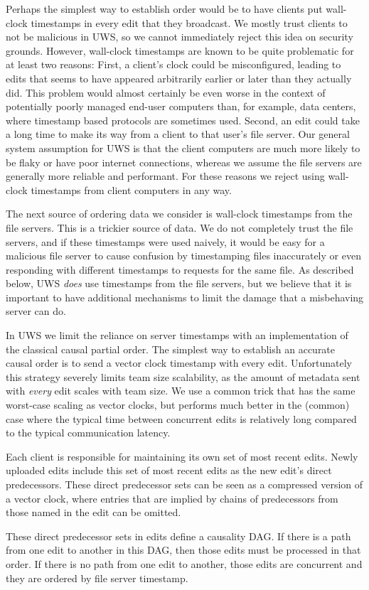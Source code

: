 \documentclass{article}
\begin{document}
Perhaps the simplest way to establish order would be to have clients put wall-clock timestamps in every edit that they broadcast.
We mostly trust clients to not be malicious in UWS, so we cannot immediately reject this idea on security grounds.
However, wall-clock timestamps are known to be quite problematic for at least two reasons:
First, a client's clock could be misconfigured, leading to edits that seems to have appeared arbitrarily earlier or later than they actually did.
This problem would almost certainly be even worse in the context of potentially poorly managed end-user computers than, for example, data centers, where timestamp based protocols are sometimes used.
Second, an edit could take a long time to make its way from a client to that user's file server.
Our general system assumption for UWS is that the client computers are much more likely to be flaky or have poor internet connections, whereas we assume the file servers are generally more reliable and performant.
For these reasons we reject using wall-clock timestamps from client computers in any way.

The next source of ordering data we consider is wall-clock timestamps from the file servers.
This is a trickier source of data.
We do not completely trust the file servers, and if these timestamps were used naively, it would be easy for a malicious file server to cause confusion by timestamping files inaccurately or even responding with different timestamps to requests for the same file.
As described below, UWS \emph{does} use timestamps from the file servers, but we believe that it is important to have additional mechanisms to limit the damage that a misbehaving server can do.

In UWS we limit the reliance on server timestamps with an implementation of the classical causal partial order.
The simplest way to establish an accurate causal order is to send a vector clock timestamp with every edit.
Unfortunately this strategy severely limits team size scalability, as the amount of metadata sent with \emph{every} edit scales with team size.
We use a common trick that has the same worst-case scaling as vector clocks, but performs much better in the (common) case where the typical time between concurrent edits is relatively long compared to the typical communication latency.

Each client is responsible for maintaining its own set of most recent edits.
Newly uploaded edits include this set of most recent edits as the new edit's direct predecessors.
These direct predecessor sets can be seen as a compressed version of a vector clock, where entries that are implied by chains of predecessors from those named in the edit can be omitted.

These direct predecessor sets in edits define a causality DAG.
If there is a path from one edit to another in this DAG, then those edits must be processed in that order.
If there is no path from one edit to another, those edits are concurrent and they are ordered by file server timestamp.
\end{document}
